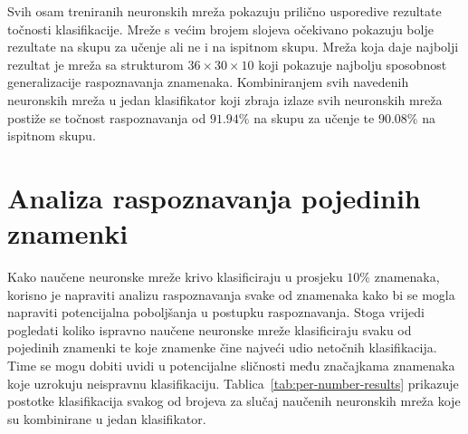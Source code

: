 Svih osam treniranih neuronskih mreža pokazuju prilično usporedive rezultate točnosti klasifikacije. Mreže s većim
brojem slojeva očekivano pokazuju bolje rezultate na skupu za učenje ali ne i na ispitnom skupu. Mreža koja daje
najbolji rezultat je mreža sa strukturom $36 \times 30 \times 10$ koji pokazuje najbolju sposobnost generalizacije
raspoznavanja znamenaka. Kombiniranjem svih navedenih neuronskih mreža u jedan klasifikator koji zbraja izlaze svih
neuronskih mreža postiže se točnost raspoznavanja od $91.94\%$ na skupu za učenje te $90.08\%$ na ispitnom skupu.


\section{Analiza raspoznavanja pojedinih znamenki}
Kako naučene neuronske mreže krivo klasificiraju u prosjeku $10\%$ znamenaka, korisno je napraviti analizu raspoznavanja
svake od znamenaka kako bi se mogla napraviti potencijalna poboljšanja u postupku raspoznavanja. Stoga vrijedi
pogledati koliko ispravno naučene neuronske mreže klasificiraju svaku od pojedinih znamenki te koje znamenke čine
najveći udio netočnih klasifikacija. Time se mogu dobiti uvidi u potencijalne sličnosti među značajkama znamenaka koje
uzrokuju neispravnu klasifikaciju. Tablica\ \ref{tab:per-number-results} prikazuje postotke klasifikacija svakog od
brojeva za slučaj naučenih neuronskih mreža koje su kombinirane u jedan klasifikator.
